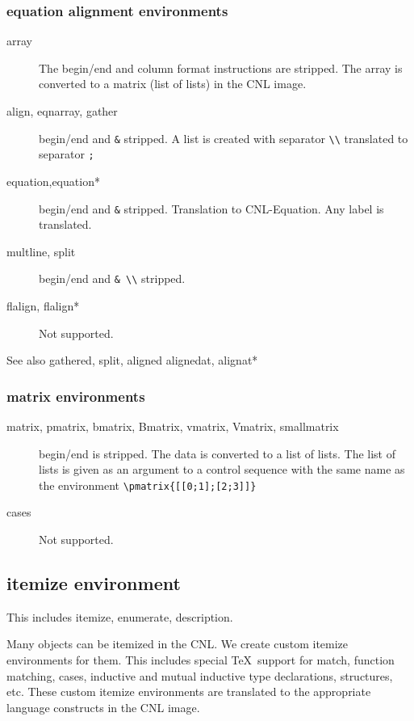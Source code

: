 \documentclass[12pt]{amsart}
\begin{document}
\subsubsection{equation alignment environments}

\begin{description}
\item [array] The begin/end and column format
instructions are stripped.  The array is converted
to a matrix (list of lists) in the CNL image.
\item [align, eqnarray, gather] begin/end and \verb!&! stripped.
A list is created with separator \verb!\\! translated
to separator \verb!;!
\item [equation,equation*]
begin/end and \verb!&! stripped.
Translation to CNL-Equation.  Any label is translated.
\item [multline, split]  begin/end and \verb!& \\! stripped.
\item [flalign, flalign*]  Not supported.
\end{description}

See also gathered, split, aligned alignedat, alignat* 

\subsubsection{matrix environments}

\begin{description}
\item [matrix, pmatrix, bmatrix, Bmatrix, vmatrix, Vmatrix, smallmatrix]   begin/end is stripped. The data is converted to a list of lists.  The list of lists is
given as an argument to a control sequence with the same name as the environment \verb!\pmatrix{[[0;1];[2;3]]}!
\item [cases] Not supported.
\end{description}



\subsection{itemize environment}

This includes itemize, enumerate, description.

Many objects can be itemized in the CNL.  We create
custom itemize environments for them.
This includes special \TeX\ support for match, function matching,
cases, inductive
and mutual inductive type declarations, structures, etc.
These custom itemize environments are translated to the
appropriate language constructs in the CNL image.
\end{document}
